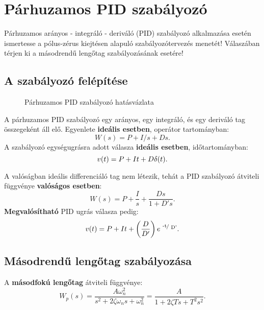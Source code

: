 \section{Párhuzamos PID szabályozó}

\begin{about}
  Párhuzamos arányos - integráló - deriváló (PID) szabályozó alkalmazása esetén
  ismertesse a pólus-zérus kiejtésen alapuló szabályozótervezés menetét!
  Válaszában térjen ki a másodrendű lengőtag szabályozásának esetére!
\end{about}

\subsection{A szabályozó felépítése}

\begin{figure}[htb]
  \centering
  
  \caption{Párhuzamos PID szabályozó hatásvázlata}
  \label{fig:PID}
\end{figure}

A párhuzamos PID szabályozó egy arányos, egy integráló, és egy deriváló tag
összegeként áll elő. Egyenlete \textbf{ideális esetben}, operátor tartományban:
\begin{equation}
  W(s) = P + I / s + Ds.
  \label{eq:PID-s}
\end{equation}
A szabályozó egységugrásra adott válasza \textbf{ideális esetben},
időtartományban:
\begin{equation}
  v(t) = P + I t + D \delta(t).
  \label{eq:PID-step}
\end{equation}

A valóságban ideális differenciáló tag nem létezik, tehát a PID szabályozó
átviteli függvénye \textbf{valóságos esetben}:
\begin{equation}
  W(s) = P + \frac{I}{s} + \frac{Ds}{1 + D's}.
  \label{eq:PID-real-s}
\end{equation}
\textbf{Megvalósítható} PID ugrás válasza pedig:
\begin{equation}
  v(t) = P + It + \left(\frac{D}{D'}\right) e^{\slashfrac{-t}{D'}}.
  \label{eq:PID-real-step}
\end{equation}

\subsection{Másodrendű lengőtag szabályozása}

A \textbf{másodfokú lengőtag} átviteli függvénye:
\begin{equation}
  W_p(s)
  = \frac{A \omega_n^2}{s^2 + 2 \zeta \omega_n s + \omega_n^2}
  = \frac{A}{1 + 2 \zeta T s + T^2 s^2}
  .
  \label{eq:W-ref}
\end{equation}

